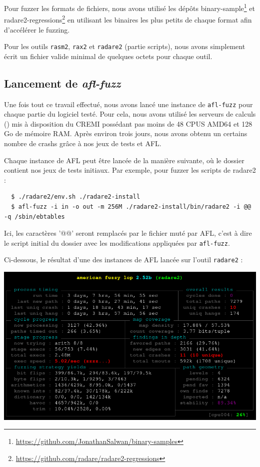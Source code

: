 Pour fuzzer les formats de fichiers, nous avons utilisé les dépôts binary-sample\footnote{\url{https://github.com/JonathanSalwan/binary-samples}} et radare2-regressions\footnote{\url{https://github.com/radare/radare2-regressions}} en utilisant les binaires les plus petits de chaque format afin d'accélérer le fuzzing.

Pour les outils \lstinline{rasm2}, \lstinline{rax2} et \lstinline{radare2} (partie scripts), nous avons simplement écrit un fichier valide minimal de quelques octets pour chaque outil.

\subsection{Lancement de \emph{afl-fuzz}}

Une fois tout ce travail effectué, nous avons lancé une instance de \lstinline{afl-fuzz} pour chaque partie du logiciel testé.
Pour cela, nous avons utilisé les serveurs de calculs () mis à disposition du CREMI possédant pas moins de 48 CPUS AMD64 et 128 Go de mémoire RAM.
Après environ trois jours, nous avons obtenu un certains nombre de crashs grâce à nos jeux de tests et AFL.

Chaque instance de AFL peut être lancée de la manière suivante, où le dossier  contient nos jeux de tests initiaux.
Par exemple, pour fuzzer les scripts de radare2 :

\begin{lstlisting}
  $ ./radare2/env.sh ./radare2-install
  $ afl-fuzz -i in -o out -m 256M ./radare2-install/bin/radare2 -i @@ -q /sbin/ebtables
\end{lstlisting}

Ici, les caractères '@@' seront remplacés par le fichier muté par AFL, c'est à dire le script initial du dossier  avec les modifications appliquées par \lstinline{afl-fuzz}.

Ci-dessous, le résultat d'une des instances de AFL lancée sur l'outil \lstinline{radare2} :

\includegraphics[width=0.9\linewidth]{../medias/afl-fuzz.png}

